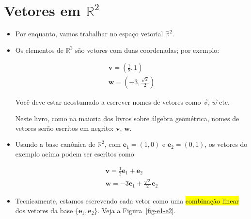 \documentclass[
  letterpaper,
  DIV=11,
  numbers=noendperiod]{scrreprt}
\begin{document}
\hypertarget{sec-vetores-r2}{%
\section{\texorpdfstring{Vetores em
$\mathbb{R}^2$}{Vetores em }}\label{sec-vetores-r2}}

\begin{itemize}
\item
  Por enquanto, vamos trabalhar no espaço vetorial $\mathbb{R}^2$.
\item
  Os elementos de $\mathbb{R}^2$ são vetores com duas coordenadas; por
  exemplo:

  \[
  \begin{array}{l}
    \mathbf{v} = (\frac12, 1)\\
    \mathbf{w} = \left( -3, \frac{\sqrt{2}}{2} \right)
  \end{array}
  \]

  \begin{tcolorbox}[standard jigsaw,bottomtitle=1mm, opacityback=0, title=\textcolor{quarto-callout-warning-color}{\faExclamationTriangle}\hspace{0.5em}{Notação: vetores em negrito}, colframe=quarto-callout-warning-color-frame, opacitybacktitle=0.6, left=2mm, coltitle=black, rightrule=.15mm, titlerule=0mm, colback=white, colbacktitle=quarto-callout-warning-color!10!white, arc=.35mm, bottomrule=.15mm, toprule=.15mm, leftrule=.75mm, toptitle=1mm]
  Você deve estar acostumado a escrever nomes de vetores como $\vec v$,
  $\vec w$ etc.

  Neste livro, como na maioria dos livros sobre álgebra geométrica,
  nomes de vetores serão escritos em negrito: $\mathbf{v}$,
  $\mathbf{w}$.
  \end{tcolorbox}
\item
  Usando a base canônica de $\mathbb{R}^2$, com
  $\mathbf{e}_{1} = (1, 0)$ e $\mathbf{e}_{2} = (0, 1)$, os vetores do
  exemplo acima podem ser escritos como

  \[
  \begin{array}{l}
    \mathbf{v} = \frac12\mathbf{e}_{1} + \mathbf{e}_{2}\\
    \mathbf{w} = -3 \mathbf{e}_{1} + \frac{\sqrt{2}}{2}\mathbf{e}_{2}
  \end{array}
  \]
\item
  Tecnicamente, estamos escrevendo cada vetor como uma {\hl{combinação
  linear}} dos vetores da base $\{ \mathbf{e}_{1}, \mathbf{e}_{2} \}$.
  Veja a Figura~\ref{fig-e1-e2}.


\end{itemize}
\end{document}
